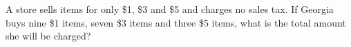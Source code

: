 A store sells items for only \$1, \$3 and \$5 and charges no sales tax. If Georgia buys nine \$1 items, seven \$3 items and three \$5 items, what is the total amount she will be charged?
